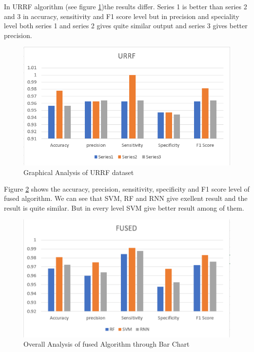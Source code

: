 \vspace{0.5cm}
In URRF algorithm (see figure \ref{fig:Chart 2})the results differ. Series 1 is better than series 2 and 3 in accuracy, sensitivity and F1 score level but in precision and speciality level both series 1 and series 2 gives quite similar output and series 3 gives better precision. 
\begin{figure}[!ht]
    \centering
    \includegraphics[scale=0.75]{Chap5/Bar 2.PNG}
    \caption{Graphical Analysis of URRF dataset}
    \label{fig:Chart 2}
\end{figure}

Figure \ref{fig:Chart 3} shows the accuracy, precision, sensitivity, specificity and F1 score level of fused algorithm. We can see that SVM, RF and RNN give exellent result and the result is quite similar. But in every level SVM give better result among of them.  
\begin{figure}[!ht]
    \centering
    \includegraphics[scale=0.67]{Chap5/Bar.pdf}
    \caption{Overall Analysis of fused Algorithm through Bar Chart}
    \label{fig:Chart 3}
\end{figure}





